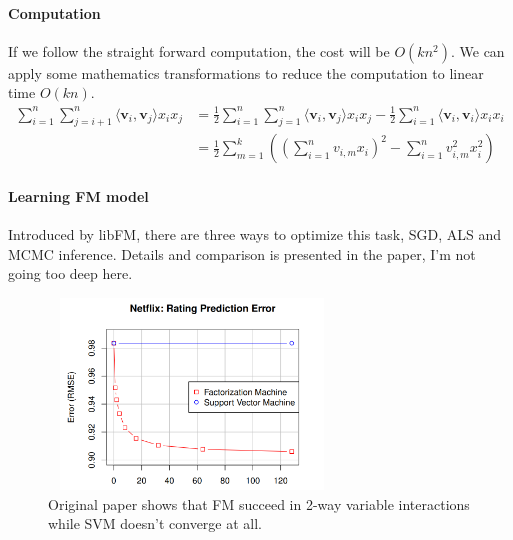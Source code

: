 \documentclass{article}
\begin{document}
\paragraph{Computation}
If we follow the straight forward computation, the cost will be $O(kn^{2})$. We can apply some mathematics transformations to reduce the computation to linear time $O(kn)$.
\begin{align*}
\sum_{i=1}^{n}\sum_{j=i+1}^{n}\langle \textbf{v}_{i} ,\textbf{v}_{j} \rangle x_{i}x_{j}
&= \frac{1}{2} \sum_{i=1}^{n}\sum_{j=1}^{n}\langle \textbf{v}_{i} ,\textbf{v}_{j} \rangle x_{i}x_{j} -\frac{1}{2}\sum_{i=1}^{n}\langle \textbf{v}_{i} ,\textbf{v}_{i} \rangle x_{i}x_{i} \\
&= \frac{1}{2}\sum_{m=1}^{k}\left( \left(\sum_{i=1}^{n}v_{i,m}x_{i}\right)^{2} -\sum_{i=1}^{n}v_{i,m}^{2}x_{i}^{2} \right)
\end{align*}

\paragraph{Learning FM model} Introduced by libFM\cite{DBLP:journals/tist/Rendle12}, there are three ways to optimize this task, SGD, ALS and MCMC inference. Details and comparison is presented in the paper, I'm not going too deep here.

\begin{figure}[H]
\centering
\includegraphics[width=3in,height=2in]{figure3}
\caption{Original paper shows that FM succeed in 2-way variable interactions while SVM doesn't converge at all.}
\end{figure}
\end{document}
